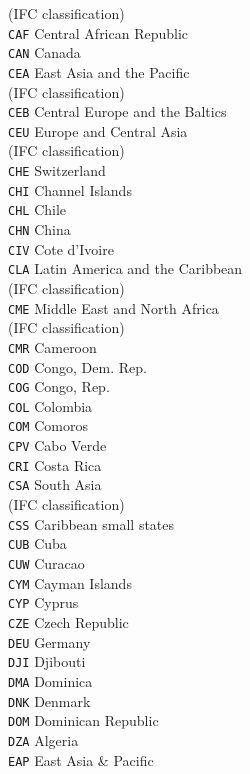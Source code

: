 \begin{multicols}{3}
{(IFC classification)\\
\texttt{CAF}	Central African Republic\\
\texttt{CAN}	Canada\\
\texttt{CEA}	East Asia and the Pacific\\
(IFC classification)\\
\texttt{CEB}	Central Europe and the Baltics\\
\texttt{CEU}	Europe and Central Asia\\
(IFC classification)\\
\texttt{CHE}	Switzerland\\
\texttt{CHI}	Channel Islands\\
\texttt{CHL}	Chile\\
\texttt{CHN}	China\\
\texttt{CIV}	Cote d'Ivoire\\
\texttt{CLA}	Latin America and the Caribbean\\
(IFC classification)\\
\texttt{CME}	Middle East and North Africa\\
(IFC classification)\\
\texttt{CMR}	Cameroon\\
\texttt{COD}	Congo, Dem. Rep.\\
\texttt{COG}	Congo, Rep.\\
\texttt{COL}	Colombia\\
\texttt{COM}	Comoros\\
\texttt{CPV}	Cabo Verde\\
\texttt{CRI}	Costa Rica\\
\texttt{CSA}	South Asia\\
(IFC classification)\\
\texttt{CSS}	Caribbean small states\\
\texttt{CUB}	Cuba\\
\texttt{CUW}	Curacao\\
\texttt{CYM}	Cayman Islands\\
\texttt{CYP}	Cyprus\\
\texttt{CZE}	Czech Republic\\
\texttt{DEU}	Germany\\
\texttt{DJI}	Djibouti\\
\texttt{DMA}	Dominica\\
\texttt{DNK}	Denmark\\
\texttt{DOM}	Dominican Republic\\
\texttt{DZA}	Algeria\\
\texttt{EAP}	East Asia \& Pacific\\
}
\end{multicols}
